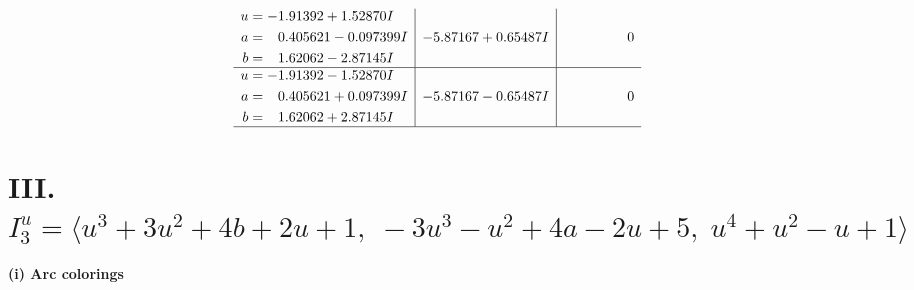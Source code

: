 \documentclass[1p]{elsarticle_modified}
\theoremstyle{definition}
\begin{document}
$$\begin{array}{c|c|c}
\begin{aligned}
u &= -1.91392 + 1.52870 I \\
a &= \phantom{-}0.405621 - 0.097399 I \\
b &= \phantom{-}1.62062 - 2.87145 I\end{aligned}
 & -5.87167 + 0.65487 I & \phantom{-0.000000 } 0 \\ \hline\begin{aligned}
u &= -1.91392 - 1.52870 I \\
a &= \phantom{-}0.405621 + 0.097399 I \\
b &= \phantom{-}1.62062 + 2.87145 I\end{aligned}
 & -5.87167 - 0.65487 I & \phantom{-0.000000 } 0\\
 \hline 
 \end{array}$$\newpage\newpage\renewcommand{\arraystretch}{1}
\centering \section*{III. $I^u_{3}= \langle u^3+3 u^2+4 b+2 u+1,\;-3 u^3- u^2+4 a-2 u+5,\;u^4+u^2- u+1 \rangle$}
\flushleft \textbf{(i) Arc colorings}\\
\end{document}
